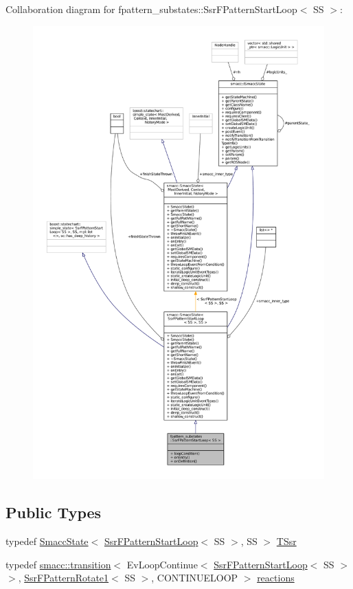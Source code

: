 Collaboration diagram for fpattern\+\_\+substates\+:\+:Ssr\+F\+Pattern\+Start\+Loop$<$ SS $>$\+:
\nopagebreak
\begin{figure}[H]
\begin{center}
\leavevmode
\includegraphics[width=350pt]{structfpattern__substates_1_1SsrFPatternStartLoop__coll__graph}
\end{center}
\end{figure}
\subsection*{Public Types}
\begin{DoxyCompactItemize}
\item 
typedef \hyperlink{classSmaccState}{Smacc\+State}$<$ \hyperlink{structfpattern__substates_1_1SsrFPatternStartLoop}{Ssr\+F\+Pattern\+Start\+Loop}$<$ SS $>$, SS $>$ \hyperlink{structfpattern__substates_1_1SsrFPatternStartLoop_acaa05713553abdd5c559d46ee705d539}{T\+Ssr}
\item 
typedef \hyperlink{classsmacc_1_1transition}{smacc\+::transition}$<$ Ev\+Loop\+Continue$<$ \hyperlink{structfpattern__substates_1_1SsrFPatternStartLoop}{Ssr\+F\+Pattern\+Start\+Loop}$<$ SS $>$ $>$, \hyperlink{structfpattern__substates_1_1SsrFPatternRotate1}{Ssr\+F\+Pattern\+Rotate1}$<$ SS $>$, C\+O\+N\+T\+I\+N\+U\+E\+L\+O\+OP $>$ \hyperlink{structfpattern__substates_1_1SsrFPatternStartLoop_a0ba482645c2e018fe83e4d767548d506}{reactions}
\end{DoxyCompactItemize}
